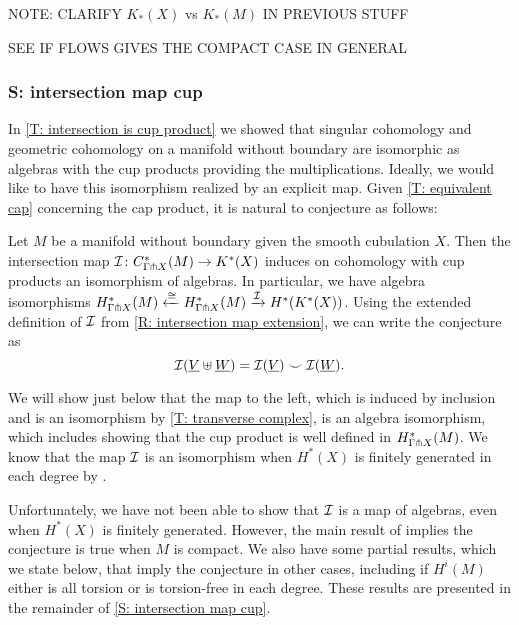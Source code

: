 \documentclass{amsart}
\begin{document}
 NOTE: CLARIFY $K_*(X)$ vs $K_*(M)$ IN PREVIOUS STUFF


SEE IF FLOWS GIVES THE COMPACT CASE IN GENERAL

\subsubsection{S: intersection map cup}


In \cref{T: intersection is cup product} we showed that singular cohomology and geometric cohomology on a manifold without boundary are isomorphic as algebras with the cup products providing the multiplications. Ideally, we would like to have this isomorphism realized by an explicit map. Given \cref{T: equivalent cap} concerning the cap product, it is natural to conjecture as follows:

\begin{conjecture}\label{cup conjecture}
Let $M$ be a manifold without boundary given the smooth cubulation $X$. Then the intersection map  $\mathcal{I} \colon C^*_{\Gamma \pitchfork X}(M) \to K^*(X)$ induces on cohomology with cup products an isomorphism of algebras. In particular, we have algebra isomorphisms $H^*_{\Gamma\pitchfork X}(M) \xleftarrow{\cong} H^*_{\Gamma\pitchfork X}(M)\xrightarrow{\mathcal{I}} H^*(K^*(X))$. Using the extended definition of $\mathcal{I}$ from \cref{R: intersection map extension}, we can write the conjecture as 
$$\mathcal{I}(\underline{V} \uplus \underline{W}) = \mathcal{I}(\underline{V}) \smile \mathcal{I}(\underline{W}).$$
\end{conjecture}

We will show just below that the map to the left, which is induced by inclusion and is an isomorphism by \cref{T: transverse complex}, is an algebra isomorphism, which includes showing that the cup product is well defined in $H^*_{\Gamma\pitchfork X}(M)$. We know that the map $\mathcal{I}$ is an isomorphism when $H^*(X)$ is finitely generated in each degree by \cite{T: intersection qi}. 

Unfortunately, we have not been able to show that $\mathcal{I}$ is a map of algebras, even when $H^*(X)$ is finitely generated. However, the main result of \cite{FMS-flows} implies the conjecture is true when $M$ is compact. We also have some partial results, which we state below, that imply the conjecture in other cases, including if $H^i(M)$  either is all torsion or is torsion-free in each degree. These results are presented in the remainder of \cref{S: intersection map cup}.
\end{document}

